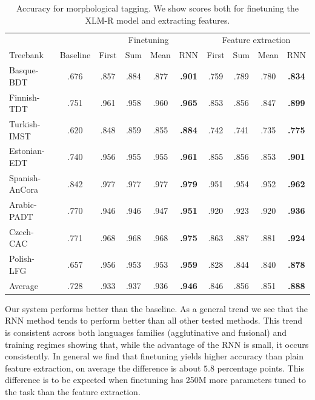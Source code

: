 \documentclass[11pt]{article}
\begin{document}
    \begin{table}%
	\centering
	\begin{tabular}{l|c|cccc|cccc}
		& & \multicolumn{4}{c}{Finetuning} & \multicolumn{4}{c}{Feature extraction} \\
		Treebank & Baseline & First & Sum & Mean & RNN & First & Sum & Mean & RNN \\
		\hline
		Basque-BDT      & .676 & .857 & .884 & .877 & \textbf{.901} & .759 & .789 & .780 & \textbf{.834} \\
		Finnish-TDT     & .751 & .961 & .958 & .960 & \textbf{.965} & .853 & .856 & .847 & \textbf{.899} \\
		Turkish-IMST    & .620 & .848 & .859 & .855 & \textbf{.884} & .742 & .741 & .735 & \textbf{.775} \\
		Estonian-EDT    & .740 & .956 & .955 & .955 & \textbf{.961} & .855 & .856 & .853 & \textbf{.901} \\
		Spanish-AnCora  & .842 & .977 & .977 & .977 & \textbf{.979} & .951 & .954 & .952 & \textbf{.962} \\
		Arabic-PADT     & .770 & .946 & .946 & .947 & \textbf{.951} & .920 & .923 & .920 & \textbf{.936} \\
		Czech-CAC       & .771 & .968 & .968 & .968 & \textbf{.975} & .863 & .887 & .881 & \textbf{.924} \\
		Polish-LFG      & .657 & .956 & .953 & .953 & \textbf{.959} & .828 & .844 & .840 & \textbf{.878} \\
        \hline
        Average         & .728 & .933 & .937 & .936 & \textbf{.946} & .846 & .856 & .851 & \textbf{.888} \\
	\end{tabular}
    	\caption{\label{tab:results_tokens} Accuracy for morphological
          tagging. We show scores both for finetuning the XLM-R model and
          extracting features.}
    \end{table}


                Our system performs better than the baseline. As a
     general trend we see that the RNN method tends to perform better
     than all other tested methods. This trend is consistent across
     both languages families (agglutinative and fusional) and
     training regimes showing that, while the advantage of the RNN is
     small, it occurs consistently.
            In general we find that finetuning yields higher accuracy
     than plain feature extraction, on average the difference is about
     $5.8$ percentage points.  This difference is to be expected when
     finetuning has 250M more parameters tuned to the task than the
     feature extraction.
    
\end{document}
